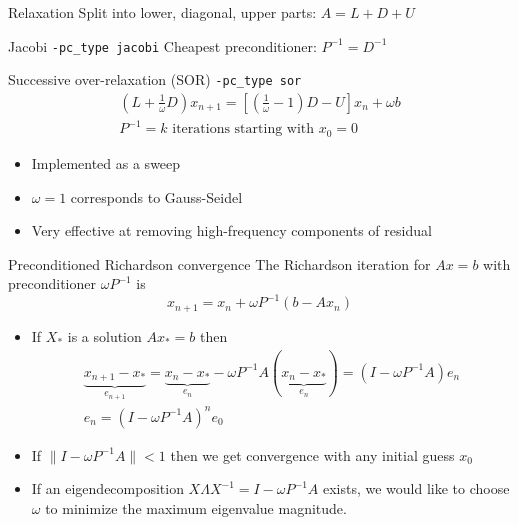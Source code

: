 \begin{frame}{Relaxation}
  Split into lower, diagonal, upper parts: \alert{$ A = L + D + U $}
  \begin{block}{Jacobi \texttt{-pc\_type jacobi}}
    Cheapest preconditioner: $P^{-1} = D^{-1}$
  \end{block}
  \begin{block}{Successive over-relaxation (SOR) \texttt{-pc\_type sor}}
    \begin{gather*}
      \left(L + \frac 1 \omega D\right) x_{n+1} = \left[\left(\frac
          1\omega-1\right)D - U\right] x_n + \omega b \\
      P^{-1} = \text{$k$ iterations starting with $x_0=0$}
    \end{gather*}
    \begin{itemize}
    \item Implemented as a sweep
    \item $\omega = 1$ corresponds to Gauss-Seidel
    \item Very effective at removing high-frequency components of residual
    \end{itemize}
  \end{block}
\end{frame}

\begin{frame}{Preconditioned Richardson convergence}
  The Richardson iteration for $A x = b$ with preconditioner $\omega P^{-1}$ is
  \begin{equation*}
    x_{n+1} = x_n + \omega P^{-1}(b - A x_n)
  \end{equation*}
  \begin{itemize}
  \item If $X_*$ is a solution $A x_* = b$ then
    \begin{gather*}
      \underbrace{x_{n+1} - x_*}_{e_{n+1}} = \underbrace{x_n - x_*}_{e_n} - \omega P^{-1}A (\underbrace{x_n - x_*}_{e_n}) = (I - \omega P^{-1}A) e_n \\
      e_n = (I - \omega P^{-1}A)^n e_0
    \end{gather*}
  \item If $\lVert I - \omega P^{-1}A \rVert < 1$ then we get convergence with any initial guess $x_0$
  \item If an eigendecomposition $X \Lambda X^{-1} = I - \omega P^{-1}A$ exists, we would like to choose $\omega$ to minimize the maximum eigenvalue magnitude.
  \end{itemize}
\end{frame}

